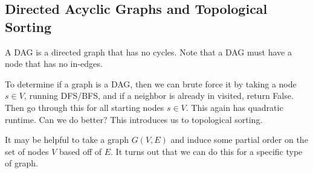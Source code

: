 \documentclass{article}
\begin{document}
    
  \subsection{Directed Acyclic Graphs and Topological Sorting}

    \begin{definition}
      A DAG is a directed graph that has no cycles. Note that a DAG must have a node that has no in-edges. 
    \end{definition}

    To determine if a graph is a DAG, then we can brute force it by taking a node $s \in V$, running DFS/BFS, and if a neighbor is already in visited, return False. Then go through this for all starting nodes $s \in V$. This again has quadratic runtime. Can we do better? This introduces us to topological sorting. 

    It may be helpful to take a graph $G(V, E)$ and induce some partial order on the set of nodes $V$ based off of $E$. It turns out that we can do this for a specific type of graph. 
    
\end{document}

